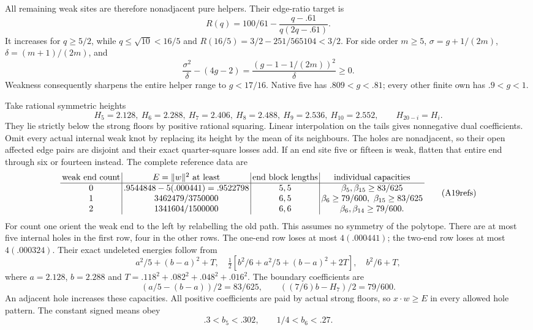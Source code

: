 \documentclass[11pt]{article}
\theoremstyle{definition}
\theoremstyle{remark}
\begin{document}
All remaining weak sites are therefore
nonadjacent pure helpers.
Their edge-ratio target is
\[
 R(q)=100/61-\frac{q-.61}{q(2q-.61)} .
\]
It increases for \(q\ge5/2\), while
\(q\le\sqrt{10}<16/5\) and
\(R(16/5)=3/2-251/565104<3/2\).
For side order \(m\ge5\),
\(\sigma=g+1/(2m)\), \(\delta=(m+1)/(2m)\),
and
\[
 \frac{\sigma^2}{\delta}-(4g-2)
                   =\frac{(g-1-1/(2m))^2}{\delta}\ge0 .
\]
Weakness consequently sharpens the
entire helper range to \(g<17/16\).
Native five has \(.809<g<.81\);
every other finite own has \(.9<g<1\).

Take rational symmetric heights
\[
 H_5=2.128,\ H_6=2.288,\ H_7=2.406,\
 H_8=2.488,\ H_9=2.536,\ H_{10}=2.552,\qquad
 H_{20-i}=H_i .
\]
They lie strictly below the strong
floors by positive rational squaring.
Linear interpolation on the tails
gives nonnegative dual coefficients.
Omit every actual internal weak knot
by replacing its height by the mean
of its neighbours.
The holes are nonadjacent, so their
open affected edge pairs are disjoint
and their exact quarter-square losses
add.
If an end site five or fifteen is
weak, flatten that entire end through
six or fourteen instead.
The complete reference data are
\[
{\setlength{\arraycolsep}{2pt}
\begin{array}{c|c|c|c}
 \text{weak end count}&E=\|w\|^2\text{ at least}
          &\text{end block lengths}&\text{individual capacities}\\ \hline
 0&.9544848-5(.000441)=.9522798&5,5&
             \beta_5,\beta_{15}\ge83/625\\
 1&3462479/3750000&6,5&
             \beta_6\ge79/600,\ \beta_{15}\ge83/625\\
 2&1341604/1500000&6,6&
             \beta_6,\beta_{14}\ge79/600 .
\end{array}}
\tag{A19refs}\label{app:exact19:eq:Arefs}
\]
For count one orient the weak end to
the left by relabelling the old path.
This assumes no symmetry of the polytope.
There are at most five internal holes
in the first row, four in the other
rows.
The one-end row loses at most
\(4(.000441)\); the two-end row loses
at most \(4(.000324)\).
Their exact undeleted energies follow
from
\[
 a^2/5+(b-a)^2+T,\quad
 \tfrac12[b^2/6+a^2/5+(b-a)^2+2T],\quad
 b^2/6+T,
\]
where \(a=2.128\), \(b=2.288\) and
\(T=.118^2+.082^2+.048^2+.016^2\).
The boundary coefficients are
\[
 (a/5-(b-a))/2=83/625,\qquad
                    ((7/6)b-H_7)/2=79/600 .
\]
An adjacent hole increases these
capacities.
All positive coefficients are paid
by actual strong floors, so
\(x\cdot w\ge E\) in every allowed
hole pattern.
The constant signed means obey
\[
                  .3<b_5<.302,\qquad1/4<b_6<.27 .
\]
\end{document}

